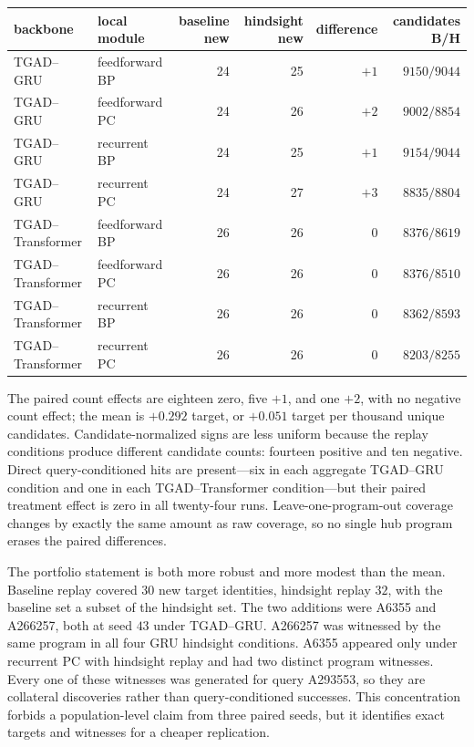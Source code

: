 \documentclass[11pt]{article}
\begin{document}
\begin{center}\small
\begin{tabular}{@{}llrrrr@{}}
\toprule
backbone & local module & baseline new & hindsight new & difference & candidates B/H \\
\midrule
TGAD--GRU & feedforward BP & 24 & 25 & $+1$ & $9150/9044$ \\
TGAD--GRU & feedforward PC & 24 & 26 & $+2$ & $9002/8854$ \\
TGAD--GRU & recurrent BP & 24 & 25 & $+1$ & $9154/9044$ \\
TGAD--GRU & recurrent PC & 24 & 27 & $+3$ & $8835/8804$ \\
TGAD--Transformer & feedforward BP & 26 & 26 & $0$ & $8376/8619$ \\
TGAD--Transformer & feedforward PC & 26 & 26 & $0$ & $8376/8510$ \\
TGAD--Transformer & recurrent BP & 26 & 26 & $0$ & $8362/8593$ \\
TGAD--Transformer & recurrent PC & 26 & 26 & $0$ & $8203/8255$ \\
\bottomrule
\end{tabular}
\end{center}

The paired count effects are eighteen zero, five $+1$, and one $+2$, with no negative
count effect; the mean is $+0.292$ target, or $+0.051$ target per thousand unique
candidates.  Candidate-normalized signs are less uniform because the replay conditions
produce different candidate counts: fourteen positive and ten negative.  Direct
query-conditioned hits are present---six in each aggregate TGAD--GRU condition and one in
each TGAD--Transformer condition---but their paired treatment effect is zero in all
twenty-four runs.  Leave-one-program-out coverage changes by exactly the same amount as
raw coverage, so no single hub program erases the paired differences.

The portfolio statement is both more robust and more modest than the mean.  Baseline
replay covered $30$ new target identities, hindsight replay $32$, with the baseline set a
subset of the hindsight set.  The two additions were A6355 and A266257, both at seed $43$
under TGAD--GRU.  A266257 was witnessed by the same program in all four GRU hindsight
conditions.  A6355 appeared only under recurrent PC with hindsight replay and had two
distinct program witnesses.  Every one of these witnesses was generated for query
A293553, so they are collateral discoveries rather than query-conditioned successes.
This concentration forbids a population-level claim from three paired seeds, but it
identifies exact targets and witnesses for a cheaper replication.
\end{document}
